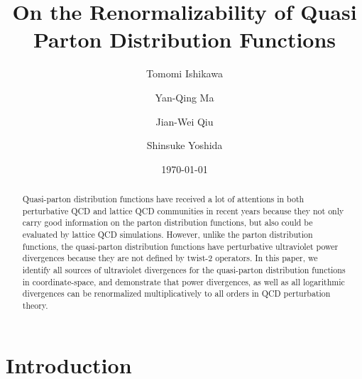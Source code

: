 \documentclass[twocolumn,aps,prd,superscriptaddress,nofootinbib,showpacs]{revtex4}
\begin{document}
\title{On the Renormalizability of Quasi Parton Distribution Functions}

\author{Tomomi Ishikawa}
\author{Yan-Qing Ma}
\author{Jian-Wei Qiu}
\author{Shinsuke Yoshida}

\date{\today}

\begin{abstract}
Quasi-parton distribution functions have received a lot of attentions in both perturbative QCD and lattice QCD communities in recent years because they not only carry good information on the parton distribution functions, but also could be evaluated by lattice QCD simulations.  However, unlike the parton distribution functions, the quasi-parton distribution functions have perturbative ultraviolet power divergences because they are not defined by twist-2 operators.  In this paper, we identify all sources of ultraviolet divergences for the quasi-parton distribution functions in coordinate-space, and demonstrate that power divergences, as well as all logarithmic divergences can be renormalized multiplicatively to all orders in QCD perturbation theory.
\end{abstract}

\maketitle
\allowdisplaybreaks


\section{Introduction}	
\label{sec:intro}
\end{document}
